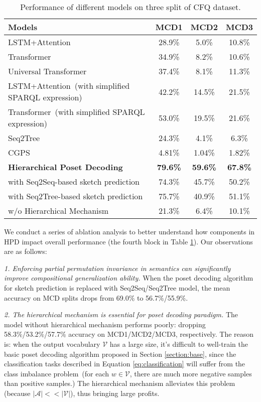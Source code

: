 \documentclass{article}
\begin{document}
\begin{table}[tbp]
\small
\caption{Performance of different models on three split of CFQ dataset.}
\centering
\begin{tabular}{lccc}
\toprule[1pt]
 Models & MCD1 & MCD2 & MCD3 \\
\midrule
LSTM+Attention~\citep{keysers2020measuring}  & 28.9\% & 5.0\% & 10.8\%  \\
Transformer~\citep{keysers2020measuring} & 34.9\% & 8.2\% & 10.6\% \\
Universal Transformer~\citep{keysers2020measuring} & 37.4\% & 8.1\% & 11.3\%\\
\midrule
LSTM+Attention~(with simplified SPARQL expression)  &42.2\%& 14.5\% & 21.5\%  \\
Transformer~(with simplified SPARQL expression) & 53.0\% &  19.5\% & 21.6\% \\
\midrule
Seq2Tree~\citep{dong-lapata-2016-language} & 24.3\% &  4.1\% & 6.3\%  \\
CGPS~\citep{li2019compositional} & 4.81\% & 1.04\% & 1.82\% \\
\midrule
\textbf{Hierarchical Poset Decoding} &\textbf{79.6\%} &  \textbf{59.6\%} & \textbf{67.8\%} \\
\qquad with Seq2Seq-based sketch prediction  & 74.3\%& 45.7\% & 50.2\%\\
\qquad with Seq2Tree-based sketch prediction  & 75.7\% & 40.9\% & 51.1\%\\
\qquad w/o Hierarchical Mechanism & 21.3\% &  6.4\% & 10.1\%\\
\bottomrule[1pt]
\end{tabular}
\label{tab:major_result}
\end{table}

We conduct a series of ablation analysis to better understand how components in HPD impact overall performance (the fourth block in Table \ref{tab:major_result}).
Our observations are as follows:

\emph{1. Enforcing partial permutation invariance in semantics can significantly improve compositional generalization ability.}
When the poset decoding algorithm for sketch prediction is replaced with Seq2Seq/Seq2Tree model, the mean accuracy on MCD splits drops from 69.0\% to 56.7\%/55.9\%.




\emph{2. The hierarchical mechanism is essential for poset decoding paradigm.}
The model without hierarchical mechanism performs poorly: dropping 58.3\%/53.2\%/57.7\% accuracy on MCD1/MCD2/MCD3, respectively.
The reason is: when the output vocabulary $\mathcal{V}$ has a large size, it's difficult to well-train the basic poset decoding algorithm proposed in Section \ref{section:base}, since the classification tasks described in Equation \ref{eq:classification} will suffer from the class imbalance problem~(for each $w\in\mathcal{V}$, there are much more negative samples than positive samples.)
The hierarchical mechanism alleviates this problem (because $|\mathcal{A}|<<|\mathcal{V}|$), thus bringing large profits.
\end{document}
